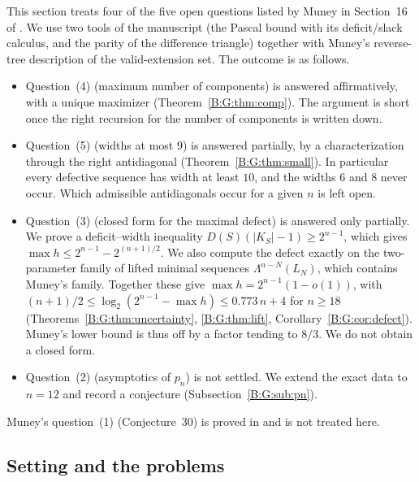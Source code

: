 \documentclass[11pt,a4paper]{article}
\theoremstyle{definition}
\theoremstyle{remark}
\numberwithin{equation}{section}
\begin{document}
This section treats four of the five open questions listed by Muney in Section~16 of
\cite{R003}. We use two tools of the manuscript \cite{R021} (the Pascal bound
with its deficit/slack calculus, and the parity of the difference triangle) together with
Muney's reverse-tree description of the valid-extension set. The outcome is as follows.
\begin{itemize}
\item Question~(4) (maximum number of components) is answered affirmatively, with a unique
 maximizer (Theorem~\ref{B:G:thm:comp}). The argument is short once the right recursion
 for the number of components is written down.
\item Question~(5) (widths at most $9$) is answered partially, by a characterization through
 the right antidiagonal (Theorem~\ref{B:G:thm:small}). In particular every defective sequence has
 width at least $10$, and the widths $6$ and $8$ never occur. Which admissible antidiagonals
 occur for a given $n$ is left open.
\item Question~(3) (closed form for the maximal defect) is answered only partially. We prove a
 deficit--width inequality $D(S)(|K_S|-1)\ge2^{n-1}$, which gives
 $\max h\le2^{n-1}-2^{(n+1)/2}$. We also compute the defect exactly on the two-parameter family
 of lifted minimal sequences $\Lambda^{n-N}(L_N)$, which contains Muney's family. Together these
 give $\max h=2^{n-1}(1-o(1))$, with
 $(n+1)/2\le\log_2(2^{n-1}-\max h)\le0.773\,n+4$ for $n\ge18$
 (Theorems~\ref{B:G:thm:uncertainty}, \ref{B:G:thm:lift}, Corollary~\ref{B:G:cor:defect}). Muney's
 lower bound is thus off by a factor tending to $8/3$. We do not obtain a closed form.
\item Question~(2) (asymptotics of $p_n$) is not settled. We extend the exact data to $n=12$
 and record a conjecture (Subsection~\ref{B:G:sub:pn}).
\end{itemize}
Muney's question~(1) (Conjecture~30) is proved in \cite{R021} and is not treated here.

\subsection{Setting and the problems}\label{B:G:sub:setting}
\end{document}
